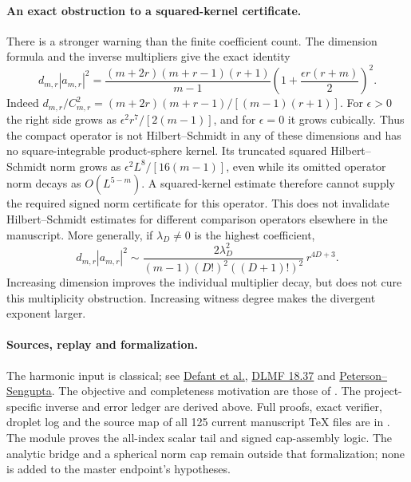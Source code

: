 \paragraph{An exact obstruction to a squared-kernel certificate.}
There is a stronger warning than the finite coefficient count. The
dimension formula and the inverse multipliers give the exact identity
\[
 \boxed{d_{m,r}|a_{m,r}|^2=
 \frac{(m+2r)(m+r-1)(r+1)}{m-1}
 \left(1+\frac{\epsilon r(r+m)}2\right)^2.}
\]
Indeed $d_{m,r}/C_{m,r}^2=(m+2r)(m+r-1)/[(m-1)(r+1)]$.
For $\epsilon>0$ the right side grows as
$\epsilon^2r^7/[2(m-1)]$, and for $\epsilon=0$ it grows cubically.
Thus the compact operator is not Hilbert--Schmidt in any of these
dimensions and has no square-integrable product-sphere kernel.
Its truncated squared Hilbert--Schmidt norm grows as
$\epsilon^2L^8/[16(m-1)]$, even while its omitted operator norm
decays as $O(L^{5-m})$. A squared-kernel estimate therefore cannot
supply the required signed norm certificate for this operator.
This does not invalidate Hilbert--Schmidt estimates for different
comparison operators elsewhere in the manuscript.
More generally, if $\lambda_D\ne0$ is the highest coefficient,
\[
 d_{m,r}|a_{m,r}|^2\sim
 \frac{2\lambda_D^2}{(m-1)(D!)^2((D+1)!)^2}\,r^{4D+3}.
\]
Increasing dimension improves the individual multiplier decay, but
does not cure this multiplicity obstruction. Increasing witness degree
makes the divergent exponent larger.

\paragraph{Sources, replay and formalization.}
The harmonic input is classical; see
\href{https://arxiv.org/abs/2411.12579}{Defant et al.},
\href{https://dlmf.nist.gov/18.37}{DLMF 18.37} and
\href{https://arxiv.org/abs/1903.07697}{Peterson--Sengupta}.
The objective and completeness motivation are those of
\cite{HJMreal26,NR14}. The project-specific inverse and error ledger
are derived above. Full proofs, exact verifier, droplet log and the
source map of all 125 current manuscript TeX files are in
.
The module
proves the all-index scalar tail and signed cap-assembly logic.
The analytic bridge and a spherical norm cap remain outside that
formalization; none is added to the master endpoint's hypotheses.
